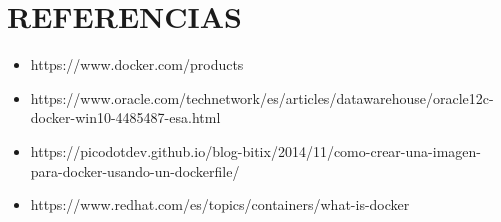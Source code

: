 \section{REFERENCIAS} 

\begin{itemize}	
\item https://www.docker.com/products
         \item https://www.oracle.com/technetwork/es/articles/datawarehouse/oracle12c-docker-win10-4485487-esa.html
         \item https://picodotdev.github.io/blog-bitix/2014/11/como-crear-una-imagen-para-docker-usando-un-dockerfile/
         \item https://www.redhat.com/es/topics/containers/what-is-docker
\end{itemize}  


